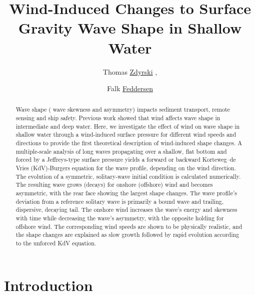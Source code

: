 \documentclass{jfm}
\title{Wind-Induced Changes to Surface Gravity Wave Shape in Shallow Water}
\author{Thomas \href{https://orcid.org/0000-0003-3039-172X}{Zdyrski}\aff{1}
  \corresp{\email{tzdyrski@uscd.edu}},
  \and Falk \href{https://orcid.org/0000-0002-5488-9074}{Feddersen}\aff{1}}
\affiliation{\aff{1}Scripps Institution of Oceanography, UCSD, La Jolla, CA 92092-0209, USA}
\begin{document}
\maketitle

\begin{abstract}
Wave shape (\eg{} wave skewness and asymmetry) impacts sediment
transport, remote sensing and ship safety.
Previous work showed that wind affects wave shape in intermediate and
deep water.
Here, we investigate the effect of wind on wave shape in shallow water
through a wind-induced surface pressure for different wind speeds and
directions to provide the first theoretical description of wind-induced
shape changes.
A multiple-scale analysis of long waves propagating over a shallow,
flat bottom and forced by a Jeffreys-type surface pressure yields a
forward or backward Korteweg--de Vries (KdV)-Burgers equation for the
wave profile, depending on the wind direction.
The evolution of a symmetric, solitary-wave initial condition is
calculated numerically.
The resulting wave grows (decays) for onshore (offshore) wind and
becomes asymmetric, with the rear face showing the largest shape
changes.
The wave profile's deviation from a reference solitary wave is primarily
a bound wave and trailing, dispersive, decaying tail.
The onshore wind increases the wave's energy and skewness with time
while decreasing the wave's asymmetry, with the opposite holding for
offshore wind.
The corresponding wind speeds are shown to be physically realistic, and
the shape changes are explained as slow growth followed by rapid
evolution according to the unforced KdV equation.
\end{abstract}

\section{\label{sec:introduction} Introduction}
\end{document}
